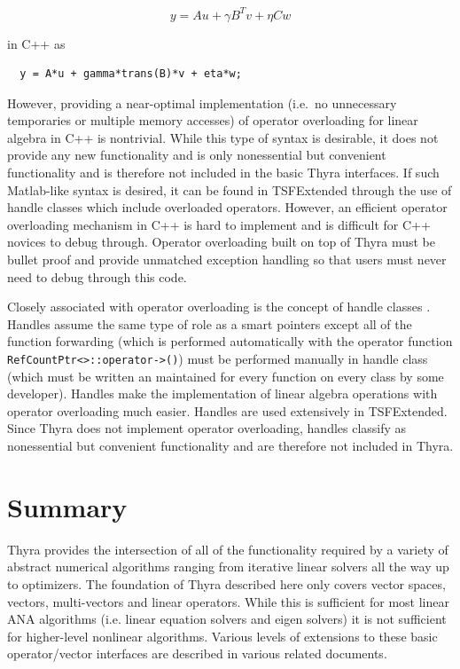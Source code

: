 \documentclass[pdf,ps2pdf,11pt]{SANDreport}
\begin{document}
\[
y = A u + \gamma B^T v + \eta C w
\]

{}\noindent{}in C++ as

\begin{verbatim}
  y = A*u + gamma*trans(B)*v + eta*w;
\end{verbatim}

{}\noindent{}However, providing a near-optimal implementation (i.e.~no
unnecessary temporaries or multiple memory accesses) of operator
overloading for linear algebra in C++ is nontrivial.  While this type
of syntax is desirable, it does not provide any new functionality and
is only nonessential but convenient functionality and is therefore not
included in the basic Thyra interfaces.  If such Matlab-like syntax
is desired, it can be found in TSFExtended through the use of handle
classes which include overloaded operators.  However, an efficient
operator overloading mechanism in C++ is hard to implement and is
difficult for C++ novices to debug through.  Operator overloading
built on top of Thyra must be bullet proof and provide unmatched
exception handling so that users must never need to debug through this
code.

Closely associated with operator overloading is the concept of handle
classes {}\cite{ref:advanced_c++_coplien}.  Handles assume the same
type of role as a smart pointers except all of the function forwarding
(which is performed automatically with the operator function
{}\texttt{RefCountPtr<>\-::operator->()}) must be performed manually
in handle class (which must be written an maintained for every function
on every class by some developer).  Handles make the implementation of
linear algebra operations with operator overloading much easier.
Handles are used extensively in TSFExtended.  Since Thyra does not
implement operator overloading, handles classify as nonessential but
convenient functionality and are therefore not included in Thyra.

%
\section{Summary}
%

Thyra provides the intersection of all of the functionality required by a
variety of abstract numerical algorithms ranging from iterative linear solvers
all the way up to optimizers.  The foundation of Thyra described here only
covers vector spaces, vectors, multi-vectors and linear operators.  While this
is sufficient for most linear ANA algorithms (i.e. linear equation solvers and
eigen solvers) it is not sufficient for higher-level nonlinear algorithms.
Various levels of extensions to these basic operator/vector interfaces are
described in various related documents.
\end{document}
